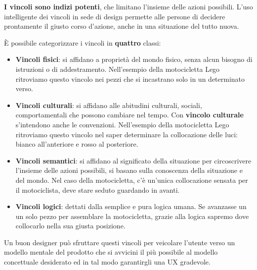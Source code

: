 \textbf{I vincoli sono indizi potenti}, che limitano l'insieme delle azioni possibili. L'uso intelligente dei vincoli in sede di design permette alle persone di decidere prontamente il giusto corso d'azione, anche in una situazione del tutto nuova.

\pagebreak

È possibile categorizzare i vincoli in \textbf{quattro} classi:
\begin{itemize}
	\item \textbf{Vincoli fisici}: si affidano a proprietà del mondo fisico, senza alcun bisogno di istruzioni o di addestramento. Nell'esempio della motocicletta Lego ritroviamo questo vincolo nei pezzi che si incastrano solo in un determinato verso.
	\item \textbf{Vincoli culturali}: si affidano alle abitudini culturali, sociali, comportamentali che possono cambiare nel tempo. Con \textbf{vincolo culturale} s'intendono anche le convenzioni. Nell'esempio della motocicletta Lego ritroviamo questo vincolo nel saper determinare la collocazione delle luci: bianco all'anteriore e rosso al posteriore.
	\item \textbf{Vincoli semantici}: si affidano al significato della situazione per circoscrivere l'insieme delle azioni possibili, si basano sulla conoscenza della situazione e del mondo. Nel caso della motocicletta, c'è un'unica collocazione sensata per il motociclista, deve stare seduto guardando in avanti.
	\item \textbf{Vincoli logici}: dettati dalla semplice e pura logica umana. Se avanzasse un un solo pezzo per assemblare la motocicletta, grazie alla logica sapremo dove collocarlo nella sua giusta posizione.
\end{itemize}

Un buon designer può sfruttare questi vincoli per veicolare l'utente verso un modello mentale del prodotto che si avvicini il più possibile al modello concettuale desiderato ed in tal modo garantirgli una UX gradevole.

